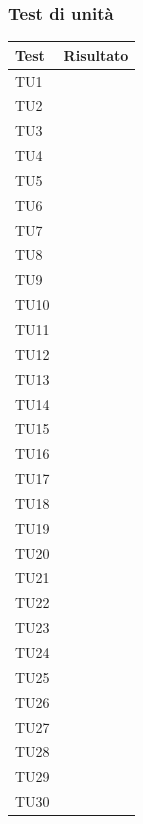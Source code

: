 \subsubsection{Test di unità}
\label{esitoTestUnita}
\TestLegend{}
   			\begin{longtable}{ | >{\centering\arraybackslash}m{5cm} | >{\centering\arraybackslash}m{5cm} | }
        
        	\hline
        		\textbf{Test} & \textbf{Risultato} \\ \hline
        	\endhead				
				TU1		&	\done{}	\\ \hline
				TU2 	&	\done{}	\\ \hline
				TU3 	&	\done{} 	\\ \hline
				TU4 	&	\done{} 	\\ \hline
				TU5		&	\done{}	\\ \hline
				TU6 	&	\done{} 	\\ \hline
				TU7 	&	\done{} 	\\ \hline
				TU8 	&	\done{} 	\\ \hline
				TU9		&	\done{}	\\ \hline
				TU10 	&	\done{}	\\ \hline
				TU11 	&	\done{}	\\ \hline
				TU12	&	\done{}	\\ \hline
				TU13 	&	\done{}	\\ \hline
				TU14	&	\done{}	\\ \hline
				TU15	&	\done{}	\\ \hline
				TU16	&	\done{}	\\ \hline
				TU17 	&	\done{}	\\ \hline
				TU18	&	\done{}	\\ \hline
				TU19	&	\done{}	\\ \hline
				TU20	&	\done{}	\\ \hline
				TU21	&	\done{}	\\ \hline
				TU22 	&	\done{}	\\ \hline
				TU23	&	\done{}	\\ \hline
				TU24 	&	\done{}	\\ \hline
				TU25	&	\done{} 	\\ \hline
				TU26 	&	\done{} 	\\ \hline
				TU27	&	\done{}	\\ \hline
				TU28 	&	\done{} 	\\ \hline
				TU29 	&	\done{} 	\\ \hline
				TU30 	&	\done{} 	\\ \hline

\end{longtable}

